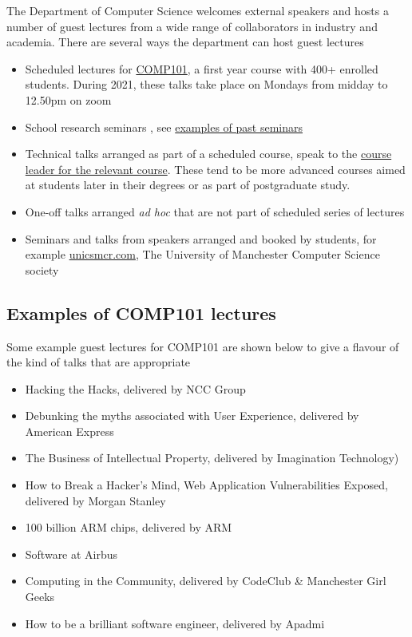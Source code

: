 \documentclass[
]{book}
\providecommand{\tightlist}{%
  \setlength{\itemsep}{0pt}\setlength{\parskip}{0pt}}
\begin{document}
The Department of Computer Science welcomes external speakers and hosts a number of guest lectures from a wide range of collaborators in industry and academia. There are several ways the department can host guest lectures

\begin{itemize}
\tightlist
\item
  Scheduled lectures for \href{https://studentnet.cs.manchester.ac.uk/ugt/COMP10120/syllabus/}{COMP101}, a first year course with 400+ enrolled students. During 2021, these talks take place on Mondays from midday to 12.50pm on zoom
\item
  School research seminars , see \href{https://www.cs.manchester.ac.uk/connect/events/past-events/}{examples of past seminars}
\item
  Technical talks arranged as part of a scheduled course, speak to the \href{https://www.cs.manchester.ac.uk/about/people/}{course leader for the relevant course}. These tend to be more advanced courses aimed at students later in their degrees or as part of postgraduate study.
\item
  One-off talks arranged \emph{ad hoc} that are not part of scheduled series of lectures
\item
  Seminars and talks from speakers arranged and booked by students, for example \href{https://unicsmcr.com/}{unicsmcr.com}, The University of Manchester Computer Science society
\end{itemize}

\hypertarget{examples-of-comp101-lectures}{%
\subsection{Examples of COMP101 lectures}\label{examples-of-comp101-lectures}}

Some example guest lectures for COMP101 are shown below to give a flavour of the kind of talks that are appropriate

\begin{itemize}
\tightlist
\item
  Hacking the Hacks, delivered by NCC Group
\item
  Debunking the myths associated with User Experience, delivered by American Express
\item
  The Business of Intellectual Property, delivered by Imagination Technology)
\item
  How to Break a Hacker's Mind, Web Application Vulnerabilities Exposed, delivered by Morgan Stanley
\item
  100 billion ARM chips, delivered by ARM
\item
  Software at Airbus
\item
  Computing in the Community, delivered by CodeClub \& Manchester Girl Geeks
\item
  How to be a brilliant software engineer, delivered by Apadmi
\end{itemize}
\end{document}
